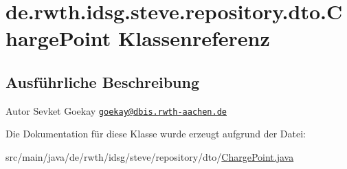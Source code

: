 \hypertarget{classde_1_1rwth_1_1idsg_1_1steve_1_1repository_1_1dto_1_1_charge_point}{\section{de.\-rwth.\-idsg.\-steve.\-repository.\-dto.\-Charge\-Point Klassenreferenz}
\label{classde_1_1rwth_1_1idsg_1_1steve_1_1repository_1_1dto_1_1_charge_point}
}


\subsection{Ausführliche Beschreibung}
\begin{DoxyAuthor}{Autor}
Sevket Goekay \href{mailto:goekay@dbis.rwth-aachen.de}{\tt goekay@dbis.\-rwth-\/aachen.\-de} 
\end{DoxyAuthor}


Die Dokumentation für diese Klasse wurde erzeugt aufgrund der Datei\-:\begin{DoxyCompactItemize}
\item 
src/main/java/de/rwth/idsg/steve/repository/dto/\hyperlink{_charge_point_8java}{Charge\-Point.\-java}\end{DoxyCompactItemize}
